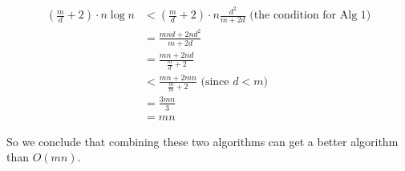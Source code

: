 \begin{align*}
        (\frac{m}{d}+2) \cdot n \log n &< (\frac{m}{d}+2) \cdot n \frac{d^2}{m+2d} \text{ (the condition for Alg 1)}\\
        &= \frac{mnd+2nd^2}{m+2d} \\
        &= \frac{mn+2nd}{\frac{m}{d}+2} \\
        &< \frac{mn+2mn}{\frac{m}{m}+2} \text{ (since $d<m$)}\\
        &= \frac{3mn}{3} \\
        &= mn
\end{align*}

So we conclude that combining these two algorithms can get a better algorithm than $O(mn)$.


